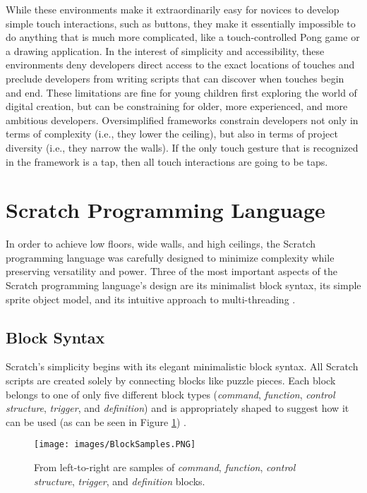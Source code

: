 While these environments make it extraordinarily easy for novices to develop simple touch interactions, such as buttons, they make it essentially impossible to do anything that is much more complicated, like a touch-controlled Pong game or a drawing application. In the interest of simplicity and accessibility, these environments deny developers direct access to the exact locations of touches and preclude developers from writing scripts that can discover when touches begin and end. These limitations are fine for young children first exploring the world of digital creation, but can be constraining for older, more experienced, and more ambitious developers. Oversimplified frameworks constrain developers not only in terms of complexity (i.e., they lower the ceiling), but also in terms of project diversity (i.e., they narrow the walls). If the only touch gesture that is recognized in the framework is a tap, then all touch interactions are going to be taps.

\section{Scratch Programming Language}

In order to achieve low floors, wide walls, and high ceilings, the Scratch programming language was carefully designed to minimize complexity while preserving versatility and power. Three of the most important aspects of the Scratch programming language's design are its minimalist block syntax, its simple sprite object model, and its intuitive approach to multi-threading \cite{Maloney}.


\subsection{Block Syntax}

Scratch's simplicity begins with its elegant minimalistic block syntax. All Scratch scripts are created solely by connecting blocks like puzzle pieces. Each block belongs to one of only five different block types (\emph{command}, \emph{function}, \emph{control structure}, \emph{trigger}, and \emph{definition}) and is appropriately shaped to suggest how it can be used (as can be seen in Figure \ref{BlockSamples}) \cite{Maloney}.

\begin{figure}
\centering
\texttt{[image: images/BlockSamples.PNG]}
\caption[Samples of Scratch's Five Block Types]
{From left-to-right are samples of \emph{command}, \emph{function}, \emph{control structure}, \emph{trigger}, and \emph{definition} blocks. }
\label{BlockSamples}
\end{figure}

